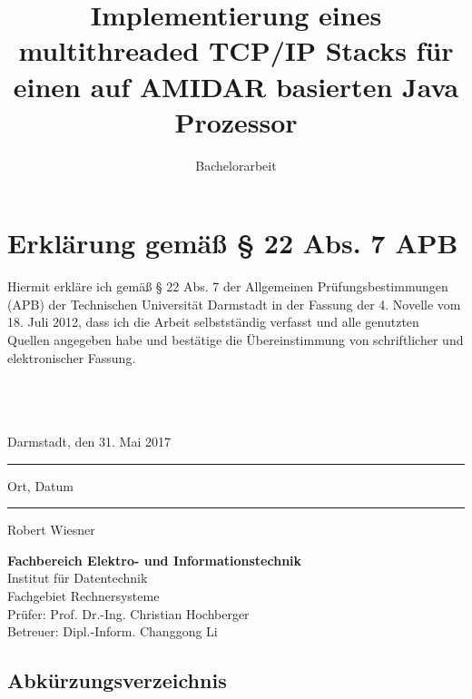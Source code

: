 \documentclass[accentcolor=tud1c,colorback,ngerman,12pt] {tudreport}
\begin{document}
\title{Implementierung eines multithreaded TCP/IP Stacks für einen auf AMIDAR basierten Java Prozessor}
\subtitle{Bachelorarbeit}

\maketitle
\chapter*{Erklärung gemäß § 22 Abs. 7 APB}

Hiermit erkläre ich gemäß § 22 Abs. 7 der Allgemeinen Prüfungsbestimmungen (APB) der Technischen Universität Darmstadt in der Fassung der 4. Novelle vom 18. Juli 2012, dass ich die Arbeit selbstständig verfasst und alle genutzten Quellen angegeben habe und bestätige die Übereinstimmung von schriftlicher und elektronischer Fassung.\\ \\ \\ \\

\parbox{8cm}{\centering Darmstadt, den 31. Mai 2017\hrule
\strut \centering\footnotesize Ort, Datum} \hfill\parbox{8cm}{\phantom{Darmstadt, den 31. Mai 2017} \hrule
\strut \centering\footnotesize Robert Wiesner}

\vfill

\noindent \textbf{Fachbereich Elektro- und Informationstechnik}\\
Institut für Datentechnik\\
Fachgebiet Rechnersysteme\\
Prüfer: Prof. Dr.-Ing. Christian Hochberger\\
Betreuer: Dipl.-Inform. Changgong Li

\tableofcontents






\section*{Abkürzungsverzeichnis}
\begin{acronym}




\end{acronym}
\end{document}
